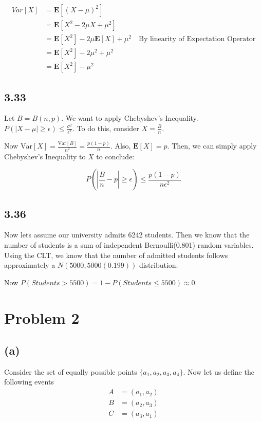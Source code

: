 \documentclass{article}
\begin{document}
	\begin{align*}
	Var[X] &= \mathbf{E}[(X - \mu)^2] \\
	&= \mathbf{E}[X^2 - 2 \mu X + \mu^2] \\
	&= \mathbf{E}[X^2] - 2 \mu \mathbf{E}[X] + \mu^2 \quad \text{By linearity of Expectation Operator}\\
	&= \mathbf{E}[X^2] - 2\mu^2 + \mu^2 \\
	&= \mathbf{E}[X^2] - \mu^2
	\end{align*}
	
	\subsection*{3.33}
	Let $B = B(n,p)$. We want to apply Chebyshev's Inequality. $P(|X- \mu| \geq \epsilon) \leq \frac{\sigma^2}{\epsilon^2}$. To do this, consider $X = \frac{B}{n}$. 
	
	Now $\text{Var}[X] = \frac{\text{Var}[B]}{n^2} = \frac{p(1-p)}{n}$. Also, $\mathbf{E}[X] = p$. Then, we can simply apply Chebyshev's Inequality to $X$ to conclude:
	
	\[ P(|\frac{B}{n} - p| \geq \epsilon ) \leq \frac{p(1-p)}{n \epsilon^2} \]
	
	\subsection*{3.36}
	Now lets assume our university admits 6242 students. Then we know that the number of students is a sum of independent Bernoulli(0.801) random variables. Using the CLT, we know that the number of admitted students follows approximately a $N(5000, 5000(0.199))$ distribution.
	
	Now $P(Students > 5500) = 1 - P(Students \leq 5500) \approx 0$. 
	
	\section*{Problem 2}
	\subsection*{(a)}
	Consider the set of equally possible points $\{ a_1, a_2, a_3, a_4\}$. Now let us define the following events
	\begin{align*}
	A &= (a_1, a_2) \\
	B &= (a_2, a_3) \\
	C &= (a_3, a_1) \\
	\end{align*}
	
\end{document}
